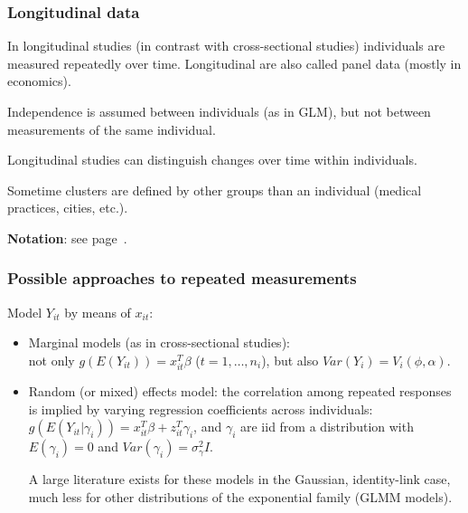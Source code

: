 \documentclass{beamer}
\newcommand{\bs}{\bigskip}
\begin{document}
\begin{frame}
\frametitle{Longitudinal data}
In {\color{blue}longitudinal studies} (in contrast with
cross-sectional studies) individuals are measured repeatedly over
time. Longitudinal are also called {\color{blue}panel data} (mostly in
economics).

\bs
Independence is assumed between individuals (as in GLM), but not between
measurements of the same individual.

\bs
Longitudinal studies can distinguish changes over time within
individuals.

\bs
Sometime {\color{blue}clusters} are defined by other groups than an
individual (medical practices, cities, etc.).

\bs
\textbf{Notation}: see page~\pageref{Ximatrix}.
\end{frame}

\begin{frame}
\frametitle{Possible approaches to repeated measurements}
Model $Y_{it}$ by means of $x_{it}$:
\begin{itemize}
\item {\color{blue}Marginal models} (as in cross-sectional studies):\\
not only $g(E(Y_{it})) = x_{it}^T \beta$ ($t=1,\ldots,n_i$), but also $Var(Y_i) = V_i(\phi,\alpha)$.
\item {\color{blue}Random (or mixed) effects model}: the correlation among
  repeated responses is
  implied by varying regression coefficients across individuals:\\
$g(E(Y_{it}|\gamma_i)) = x_{it}^T \beta + z_{it}^T \gamma_i$, and $\gamma_i$ are iid
from a  distribution with $E(\gamma_i)=0$ and $Var(\gamma_i)= \sigma^2_{\gamma}I$.

A large literature exists for these models in the Gaussian, identity-link case,
much less for other distributions of the exponential family (GLMM models).
\end{itemize}

\end{frame}
\end{document}
